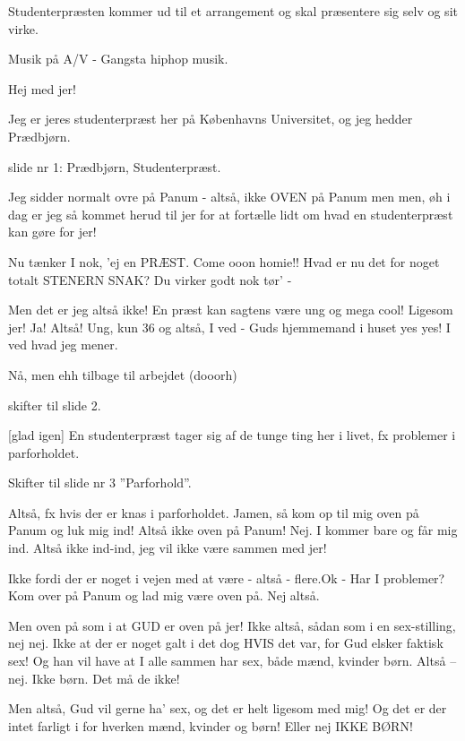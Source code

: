 \documentclass[a4paper,12pt]{article}
\begin{document}
\begin{sketch}


\scene Studenterpræsten kommer ud til et arrangement og skal præsentere sig selv og sit virke.

 Musik på A/V - Gangsta hiphop musik.


 Hej med jer!


  Jeg er jeres studenterpræst her på Københavns Universitet, og jeg hedder Prædbjørn.

 slide nr 1: Prædbjørn, Studenterpræst.

  Jeg sidder normalt ovre på Panum - altså, ikke OVEN på Panum men men, øh i dag er jeg så kommet herud til jer for at fortælle lidt om hvad en studenterpræst kan gøre for jer! 

  Nu tænker I nok, 'ej en PRÆST. Come ooon homie!! Hvad er nu det for noget totalt STENERN SNAK? Du virker godt nok tør' -

  Men det er jeg altså ikke! En præst kan sagtens være ung og mega cool! Ligesom jer! Ja! Altså! Ung, kun 36 og altså, I ved - Guds hjemmemand i huset yes yes! I ved hvad jeg mener. 

 Nå, men ehh tilbage til arbejdet (dooorh)

 skifter til slide 2.

  [glad igen] En studenterpræst tager sig af de tunge ting her i livet, fx problemer i parforholdet.

 Skifter til slide nr 3 ”Parforhold”.

 Altså, fx hvis der er knas i parforholdet. Jamen, så kom op til mig oven på Panum og luk mig ind! Altså ikke oven på Panum! Nej. I kommer bare og får mig ind. Altså ikke ind-ind, jeg vil ikke være sammen med jer! 

 Ikke fordi der er noget i vejen med at være - altså - flere.Ok - Har I problemer? Kom over på Panum og lad mig være oven på. Nej altså.

 Men oven på som i at GUD er oven på jer! Ikke altså, sådan som i en sex-stilling, nej nej. Ikke at der er noget galt i det dog HVIS det var, for Gud elsker faktisk sex! Og han vil have at I alle sammen har sex, både mænd, kvinder børn. Altså – nej. Ikke børn. Det må de ikke!

  Men altså, Gud vil gerne ha' sex, og det er helt ligesom med mig! Og det er der intet farligt i for hverken mænd, kvinder og børn! Eller nej IKKE BØRN!


\end{sketch}
\end{document}
